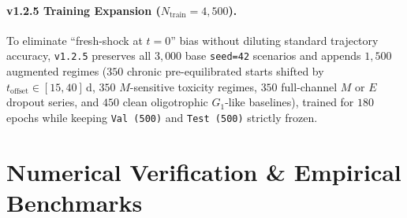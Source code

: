 \documentclass[10pt,twocolumn,a4paper]{article}
\begin{document}
\paragraph{v1.2.5 Training Expansion ($N_{\mathrm{train}} = 4{,}500$).}
To eliminate ``fresh-shock at $t=0$'' bias without diluting standard trajectory accuracy, \texttt{v1.2.5} preserves all $3{,}000$ base \texttt{seed=42} scenarios and appends $1{,}500$ augmented regimes ($350$ chronic pre-equilibrated starts shifted by $t_{\mathrm{offset}} \in [15, 40]$\,d, $350$ $M$-sensitive toxicity regimes, $350$ full-channel $M$ or $E$ dropout series, and $450$ clean oligotrophic $G_1$-like baselines), trained for $180$ epochs while keeping \texttt{Val (500)} and \texttt{Test (500)} strictly frozen.

\section{Numerical Verification \& Empirical Benchmarks}
\end{document}
